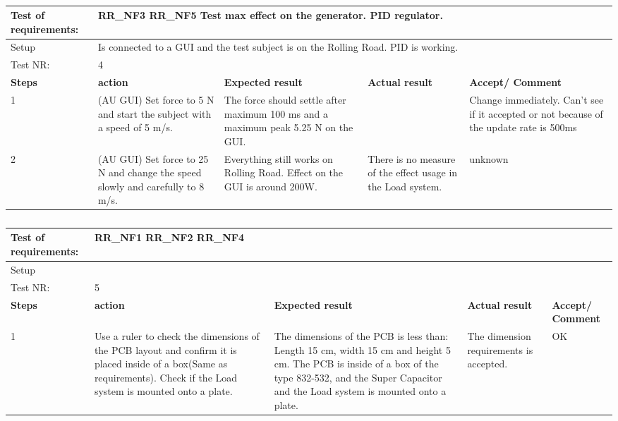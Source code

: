 \begin{table}[h!]
	\centering
	\label{my-label}	
	\begin{tabular}{|p{1.5 cm}|p{4.2 cm}|p{2.1 cm}|p{2.1 cm}|p{2.1 cm}|}
		\hline
		Test of requirements: 
		& \multicolumn{4}{l|}{RR\_NF3 RR\_NF5  Test max effect on the generator.	PID regulator.} \\ \hline
		Setup 
		& \multicolumn{4}{l|}{Is connected to a GUI and the test subject is on the Rolling Road. PID is working.} \\ \hline
		Test NR:
		& \multicolumn{4}{l|}{4} \\ \hline
		\textbf{Steps} & \textbf{action} & \textbf{Expected result} & 
		\textbf{Actual result} & \textbf{Accept/ Comment} \\ \hline
		1 
		& (AU GUI) Set force to 5 N and start the subject with a speed of 5 m/s. 
		& The force should settle after maximum 100 ms and a maximum peak 5.25 N on the GUI.  
		& 
		& Change immediately. Can't see if it accepted or not because of the update rate is 500ms\\ \hline
		2
		& (AU GUI) Set force to 25 N and change the speed slowly and carefully to 8 m/s. 
		& Everything still works on Rolling Road. Effect on the GUI is around 200W.
		& There is no measure of the effect usage in the Load system.
		& unknown \\ \hline
	\end{tabular}
	\caption{}
\end{table}

\begin{table}[h!]
	\centering
	\label{my-label}	
	\begin{tabular}{|p{1.5 cm}|p{4.2 cm}|p{2.1 cm}|p{2.1 cm}|p{2.1 cm}|}
		\hline
		Test of requirements: 
		& \multicolumn{4}{l|}{RR\_NF1 RR\_NF2 RR\_NF4} \\ \hline
		Setup 
		& \multicolumn{4}{l|}{} \\ \hline
		Test NR:
		& \multicolumn{4}{l|}{5} \\ \hline
		\textbf{Steps} & \textbf{action} & \textbf{Expected result} & 
		\textbf{Actual result} & \textbf{Accept/ Comment} \\ \hline
		1 
		& Use a ruler to check the dimensions of the PCB layout and confirm it is placed inside of a box(Same as requirements). Check if the Load system is mounted onto a plate.
		& The dimensions of the PCB is less than: Length 15 cm, width 15 cm and height 5 cm. The PCB is inside of a box of the type 832-532, and the Super Capacitor and the Load system is mounted onto a plate.
		& The dimension requirements is accepted.
		& OK\\ \hline
	\end{tabular}
	\caption{}
\end{table}


